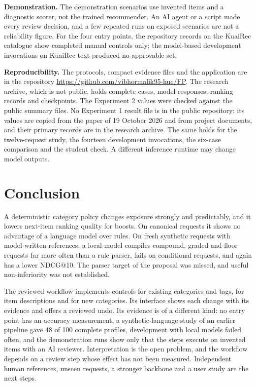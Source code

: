 \documentclass[conference]{IEEEtran}
\begin{document}
\textbf{Demonstration.} The demonstration scenarios use invented items and a diagnostic scorer, not the trained recommender. An AI agent or a script made every review decision, and a few repeated runs on exposed scenarios are not a reliability figure. For the four entry points, the repository records on the KuaiRec catalogue show completed manual controls only; the model-based development invocations on KuaiRec text produced no approvable set.

\textbf{Reproducibility.} The protocols, compact evidence files and the application are in the repository \url{https://github.com/vibhormalik95-hue/FP}. The research archive, which is not public, holds complete cases, model responses, ranking records and checkpoints. The Experiment 2 values were checked against the public summary files. No Experiment 1 result file is in the public repository: its values are copied from the paper of 19 October 2026 and from project documents, and their primary records are in the research archive. The same holds for the twelve-request study, the fourteen development invocations, the six-case comparison and the student check. A different inference runtime may change model outputs.

\section{Conclusion}
A deterministic category policy changes exposure strongly and predictably, and it lowers next-item ranking quality for boosts. On canonical requests it shows no advantage of a language model over rules. On fresh synthetic requests with model-written references, a local model compiles compound, graded and floor requests far more often than a rule parser, fails on conditional requests, and again has a lower NDCG@10. The parser target of the proposal was missed, and useful non-inferiority was not established.

The reviewed workflow implements controls for existing categories and tags, for item descriptions and for new categories. Its interface shows each change with its evidence and offers a reviewed undo. Its evidence is of a different kind: no entry point has an accuracy measurement, a synthetic-language study of an earlier pipeline gave 48 of 100 complete profiles, development with local models failed often, and the demonstration runs show only that the steps execute on invented items with an AI reviewer. Interpretation is the open problem, and the workflow depends on a review step whose effect has not been measured. Independent human references, unseen requests, a stronger backbone and a user study are the next steps.



\end{document}
